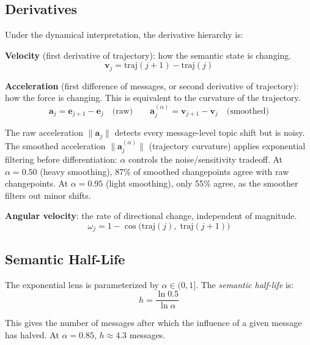 \documentclass[11pt]{article}
\begin{document}
\subsection{Derivatives}

Under the dynamical interpretation, the derivative hierarchy is:

\textbf{Velocity} (first derivative of trajectory): how the semantic state is changing.
\begin{equation}
\mathbf{v}_j = \text{traj}(j+1) - \text{traj}(j)
\end{equation}

\textbf{Acceleration} (first difference of messages, or second derivative of trajectory): how the force is changing. This is equivalent to the curvature of the trajectory.
\begin{equation}
\mathbf{a}_j = \mathbf{e}_{j+1} - \mathbf{e}_j \quad \text{(raw)} \qquad \mathbf{a}_j^{(\alpha)} = \mathbf{v}_{j+1} - \mathbf{v}_j \quad \text{(smoothed)}
\end{equation}

The raw acceleration $\|\mathbf{a}_j\|$ detects every message-level topic shift but is noisy. The smoothed acceleration $\|\mathbf{a}_j^{(\alpha)}\|$ (trajectory curvature) applies exponential filtering before differentiation: $\alpha$ controls the noise/sensitivity tradeoff. At $\alpha = 0.50$ (heavy smoothing), 87\% of smoothed changepoints agree with raw changepoints. At $\alpha = 0.95$ (light smoothing), only 55\% agree, as the smoother filters out minor shifts.

\textbf{Angular velocity}: the rate of directional change, independent of magnitude.
\begin{equation}
\omega_j = 1 - \cos\bigl(\text{traj}(j),\; \text{traj}(j+1)\bigr)
\end{equation}

\subsection{Semantic Half-Life}

The exponential lens is parameterized by $\alpha \in (0, 1]$. The \emph{semantic half-life} is:
\begin{equation}
h = \frac{\ln 0.5}{\ln \alpha}
\end{equation}

This gives the number of messages after which the influence of a given message has halved. At $\alpha = 0.85$, $h \approx 4.3$ messages.
\end{document}
